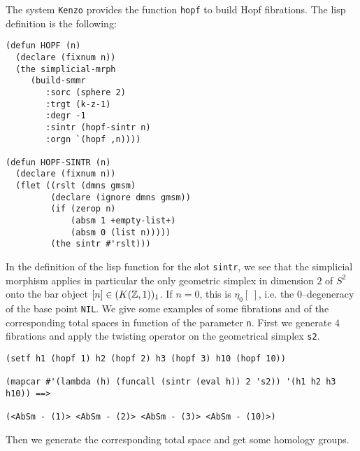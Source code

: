 \newpage
The system {\tt Kenzo} provides the function {\tt hopf} to build  
Hopf fibrations. The lisp definition is the following:
{\footnotesize\begin{verbatim}
(defun HOPF (n)
  (declare (fixnum n))
  (the simplicial-mrph
     (build-smmr
        :sorc (sphere 2)
        :trgt (k-z-1)
        :degr -1
        :sintr (hopf-sintr n)
        :orgn `(hopf ,n))))

(defun HOPF-SINTR (n)
  (declare (fixnum n))
  (flet ((rslt (dmns gmsm)
         (declare (ignore dmns gmsm))
         (if (zerop n)
             (absm 1 +empty-list+)
             (absm 0 (list n)))))
         (the sintr #'rslt)))
\end{verbatim}}
In the definition of the lisp function for the slot {\tt sintr}, we see that the simplicial morphism 
applies in particular the only geometric simplex in dimension $2$ of $S^2$ onto the bar object 
$[n] \in (K({{\Bbb Z}},1))_1$. If $n=0$, this is $\eta_0 [\ ]$, i.e. the $0$--degeneracy of the base point
{\tt NIL}. We give some examples of some fibrations and of the corresponding total spaces in function of the 
parameter {\tt n}. First we generate $4$ fibrations and apply the twisting operator
on the geometrical simplex {\tt s2}. 
{\footnotesize\begin{verbatim}
(setf h1 (hopf 1) h2 (hopf 2) h3 (hopf 3) h10 (hopf 10))

(mapcar #'(lambda (h) (funcall (sintr (eval h)) 2 's2)) '(h1 h2 h3 h10)) ==>

(<AbSm - (1)> <AbSm - (2)> <AbSm - (3)> <AbSm - (10)>)
\end{verbatim}}
Then we generate the corresponding total space and get some homology groups.
